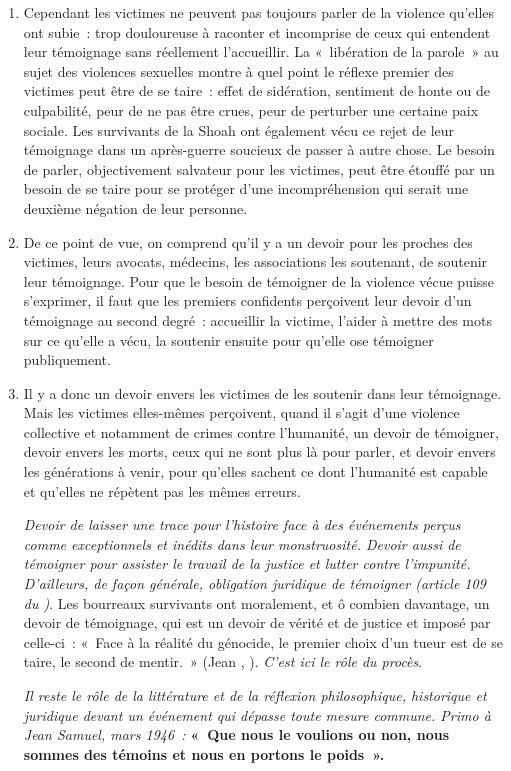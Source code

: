 {\begin{enumerate}
\item Cependant les victimes ne peuvent pas toujours parler de la violence qu'elles ont subie~:
trop douloureuse à raconter et incomprise de ceux qui entendent leur témoignage sans réellement
l'accueillir. La «~libération de la parole~» au sujet des violences sexuelles montre à quel point le
réflexe premier des victimes peut être de se taire~: effet de sidération, sentiment de honte ou de
culpabilité, peur de ne pas être crues, peur de perturber une certaine paix sociale. Les survivants
de la Shoah ont également vécu ce rejet de leur témoignage dans un après-guerre soucieux de
passer à autre chose. Le besoin de parler, objectivement salvateur pour les victimes, peut être
étouffé par un besoin de se taire pour se protéger d'une incompréhension qui serait une deuxième
négation de leur personne.

\item De ce point de vue, on comprend qu'il y a un devoir pour les proches des victimes, leurs
avocats, médecins, les associations les soutenant, de soutenir leur témoignage. Pour que le
besoin de témoigner de la violence vécue puisse s'exprimer, il faut que les premiers confidents
perçoivent leur devoir d'un témoignage au second degré~: accueillir la victime, l'aider à mettre des
mots sur ce qu'elle a vécu, la soutenir ensuite pour qu'elle ose témoigner publiquement.

\item Il y a donc un devoir envers les victimes de les soutenir dans leur témoignage. Mais les
victimes elles-mêmes perçoivent, quand il s'agit d'une violence collective et notamment de crimes
contre l'humanité, un devoir de témoigner, devoir envers les morts, ceux qui ne sont plus là pour
parler, et devoir envers les générations à venir, pour qu'elles sachent ce dont l'humanité est
capable et qu'elles ne répètent pas les mêmes erreurs.

\textit{Devoir de laisser une trace pour l'histoire face à des événements perçus comme
exceptionnels et inédits dans leur monstruosité. Devoir aussi de témoigner pour assister le travail
de la justice et lutter contre l'impunité. D'ailleurs, de façon générale, obligation juridique de
témoigner (article 109 du )}. Les bourreaux survivants ont moralement,
et ô combien davantage, un devoir de témoignage, qui est un devoir de vérité et de justice et
imposé par celle-ci~: «~Face à la réalité du génocide, le premier choix d'un tueur est de se taire,
le second de mentir.~» (Jean , ). \textit{C'est ici le rôle du procès}.

\textit{Il reste le rôle de la littérature et de la réflexion philosophique, historique et juridique devant
un événement qui dépasse toute mesure commune. Primo  à Jean Samuel, mars 1946~:}
\textbf{«~Que nous le voulions ou non, nous sommes des témoins et nous en portons le poids~».}

\end{enumerate}}

